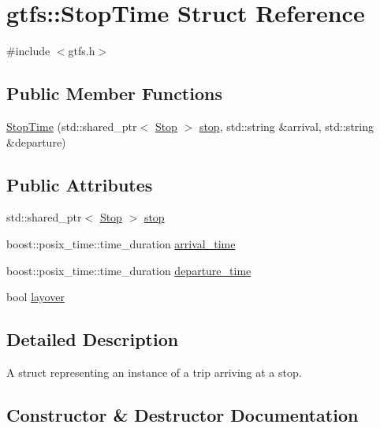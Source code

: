 \hypertarget{structgtfs_1_1StopTime}{}\section{gtfs\+:\+:Stop\+Time Struct Reference}
\label{structgtfs_1_1StopTime}


{\ttfamily \#include $<$gtfs.\+h$>$}

\subsection*{Public Member Functions}
\begin{DoxyCompactItemize}
\item 
\hyperlink{structgtfs_1_1StopTime_adb27c1b3ad66cdc37e4a78338ad2b1a5}{Stop\+Time} (std\+::shared\+\_\+ptr$<$ \hyperlink{classgtfs_1_1Stop}{Stop} $>$ \hyperlink{structgtfs_1_1StopTime_a586702c54a1ad350d486c6639558b4ca}{stop}, std\+::string \&arrival, std\+::string \&departure)
\end{DoxyCompactItemize}
\subsection*{Public Attributes}
\begin{DoxyCompactItemize}
\item 
std\+::shared\+\_\+ptr$<$ \hyperlink{classgtfs_1_1Stop}{Stop} $>$ \hyperlink{structgtfs_1_1StopTime_a586702c54a1ad350d486c6639558b4ca}{stop}
\item 
boost\+::posix\+\_\+time\+::time\+\_\+duration \hyperlink{structgtfs_1_1StopTime_a994ec898edd96675200f759acd76a57c}{arrival\+\_\+time}
\item 
boost\+::posix\+\_\+time\+::time\+\_\+duration \hyperlink{structgtfs_1_1StopTime_ad11c398eca36ff99f0934883141de3c9}{departure\+\_\+time}
\item 
bool \hyperlink{structgtfs_1_1StopTime_af8cc780329a837a49a5d6af60b74b9bf}{layover}
\end{DoxyCompactItemize}


\subsection{Detailed Description}
A struct representing an instance of a trip arriving at a stop. 

\subsection{Constructor \& Destructor Documentation}
\mbox{\label{structgtfs_1_1StopTime_adb27c1b3ad66cdc37e4a78338ad2b1a5}} 
